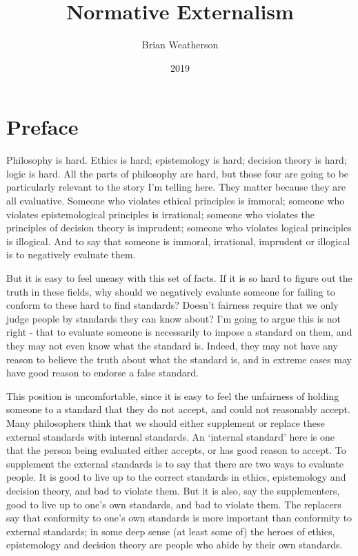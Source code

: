 \documentclass[
  10pt,
  letterpaper,
  twoside]{scrbook}
\title{Normative Externalism}
\author{Brian Weatherson}
\date{2019}
\renewcommand*\contentsname{Table of contents}
\newcommand\contentsname{Table of contents}
\begin{document}
\frontmatter
\maketitle

\renewcommand*\contentsname{Table of contents}
{
\setcounter{tocdepth}{2}
\tableofcontents
}
\mainmatter
{}

\chapter*{Preface}\label{preface}


Philosophy is hard. Ethics is hard; epistemology is hard; decision
theory is hard; logic is hard. All the parts of philosophy are hard, but
those four are going to be particularly relevant to the story I'm
telling here. They matter because they are all evaluative. Someone who
violates ethical principles is immoral; someone who violates
epistemological principles is irrational; someone who violates the
principles of decision theory is imprudent; someone who violates logical
principles is illogical. And to say that someone is immoral, irrational,
imprudent or illogical is to negatively evaluate them.

But it is easy to feel uneasy with this set of facts. If it is so hard
to figure out the truth in these fields, why should we negatively
evaluate someone for failing to conform to these hard to find standards?
Doesn't fairness require that we only judge people by standards they can
know about? I'm going to argue this is not right - that to evaluate
someone is necessarily to impose a standard on them, and they may not
even know what the standard is. Indeed, they may not have any reason to
believe the truth about what the standard is, and in extreme cases may
have good reason to endorse a false standard.

This position is uncomfortable, since it is easy to feel the unfairness
of holding someone to a standard that they do not accept, and could not
reasonably accept. Many philosophers think that we should either
supplement or replace these external standards with internal standards.
An `internal standard' here is one that the person being evaluated
either accepts, or has good reason to accept. To supplement the external
standards is to say that there are two ways to evaluate people. It is
good to live up to the correct standards in ethics, epistemology and
decision theory, and bad to violate them. But it is also, say the
supplementers, good to live up to one's own standards, and bad to
violate them. The replacers say that conformity to one's own standards
is more important than conformity to external standards; in some deep
sense (at least some of) the heroes of ethics, epistemology and decision
theory are people who abide by their own standards.
\end{document}

